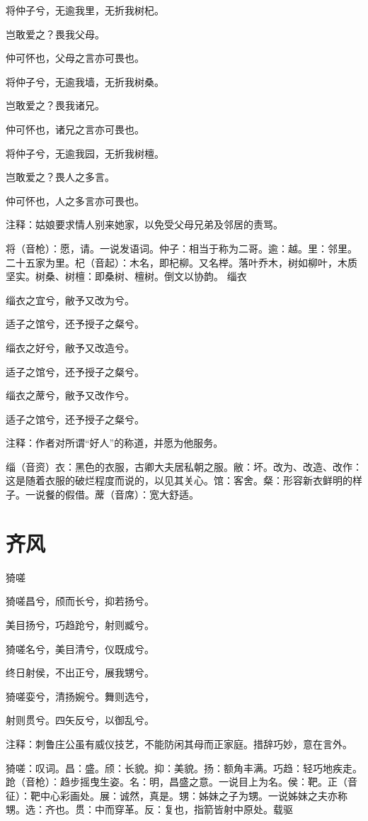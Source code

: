 \documentclass[12pt,UTF8]{ctexbook}
\begin{document}
将仲子兮，无逾我里，无折我树杞。

岂敢爱之？畏我父母。

仲可怀也，父母之言亦可畏也。

将仲子兮，无逾我墙，无折我树桑。

岂敢爱之？畏我诸兄。

仲可怀也，诸兄之言亦可畏也。

将仲子兮，无逾我园，无折我树檀。

岂敢爱之？畏人之多言。

仲可怀也，人之多言亦可畏也。

注释：姑娘要求情人别来她家，以免受父母兄弟及邻居的责骂。

将（音枪）：愿，请。一说发语词。仲子：相当于称为二哥。逾：越。里：邻里。二十五家为里。杞（音起）：木名，即杞柳。又名榉。落叶乔木，树如柳叶，木质坚实。树桑、树檀：即桑树、檀树。倒文以协韵。 缁衣

缁衣之宜兮，敝予又改为兮。

适子之馆兮，还予授子之粲兮。

缁衣之好兮，敝予又改造兮。

适子之馆兮，还予授子之粲兮。

缁衣之蓆兮，敝予又改作兮。

适子之馆兮，还予授子之粲兮。

注释：作者对所谓“好人”的称道，并愿为他服务。

缁（音资）衣：黑色的衣服，古卿大夫居私朝之服。敝：坏。改为、改造、改作：这是随着衣服的破烂程度而说的，以见其关心。馆：客舍。粲：形容新衣鲜明的样子。一说餐的假借。蓆（音席）：宽大舒适。



\part{齐风}

猗嗟

猗嗟昌兮，颀而长兮，抑若扬兮。

美目扬兮，巧趋跄兮，射则臧兮。

猗嗟名兮，美目清兮，仪既成兮。

终日射侯，不出正兮，展我甥兮。

猗嗟娈兮，清扬婉兮。舞则选兮，

射则贯兮。四矢反兮，以御乱兮。

注释：刺鲁庄公虽有威仪技艺，不能防闲其母而正家庭。措辞巧妙，意在言外。

猗嗟：叹词。昌：盛。颀：长貌。抑：美貌。扬：额角丰满。巧趋：轻巧地疾走。跄（音枪）：趋步摇曳生姿。名：明，昌盛之意。一说目上为名。侯：靶。正（音征）：靶中心彩画处。展：诚然，真是。甥：姊妹之子为甥。一说姊妹之夫亦称甥。选：齐也。贯：中而穿革。反：复也，指箭皆射中原处。载驱
\end{document}

